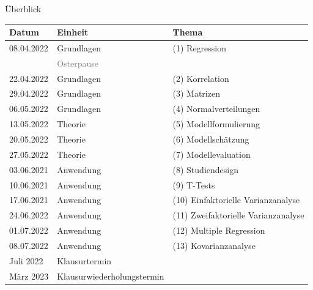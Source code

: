 \documentclass[
  8pt,
  ignorenonframetext,
]{beamer}
\begin{document}
\begin{frame}{Überblick}
\protect\hypertarget{uxfcberblick}{}
\small
\center
\footnotesize
\renewcommand{\arraystretch}{1.1}
\begin{tabular}{lll}
Datum        & Einheit                       & Thema                                              \\\hline
08.04.2022   & Grundlagen                    & (1) Regression                                 \\
             & \textcolor{gray}{Osterpause}                                             \\
22.04.2022   & Grundlagen                    & (2) Korrelation                            \\
29.04.2022   & Grundlagen                    & (3) Matrizen                             \\
06.05.2022   & Grundlagen                    & (4) Normalverteilungen                   \\
13.05.2022   & Theorie                       & (5) Modellformulierung                   \\
20.05.2022   & Theorie                       & (6) Modellschätzung                      \\
27.05.2022   & Theorie                       & (7) Modellevaluation                     \\
03.06.2021   & Anwendung                     & (8) Studiendesign                        \\
10.06.2021   & Anwendung                     & (9) T-Tests                              \\
17.06.2021   & Anwendung                     & (10) Einfaktorielle Varianzanalyse       \\
24.06.2022   & Anwendung                     & (11) Zweifaktorielle Varianzanalyse      \\
01.07.2022   & Anwendung                     & (12) Multiple Regression                 \\
08.07.2022   & Anwendung                     & (13) Kovarianzanalyse                    \\\hline
Juli 2022    & Klausurtermin                 &                                          \\
März 2023    & Klausurwiederholungstermin    &
\end{tabular}
\end{frame}
\end{document}
